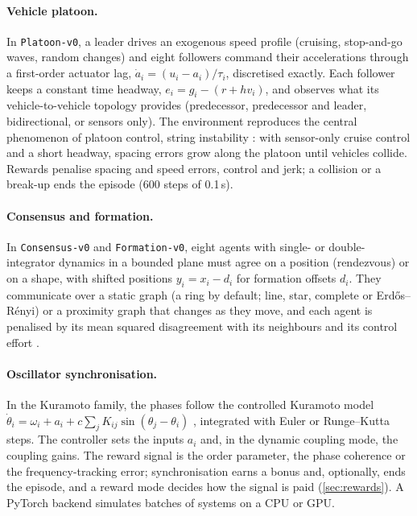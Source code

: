 \documentclass{article}
\newcommand{\envid}[1]{\texttt{#1}}
\begin{document}
\paragraph{Vehicle platoon.} In \envid{Platoon-v0}, a leader drives an
exogenous speed profile (cruising, stop-and-go waves, random changes) and
eight followers command their accelerations through a first-order actuator
lag, $\dot a_i = (u_i - a_i)/\tau_i$, discretised exactly. Each follower keeps
a constant time headway, $e_i = g_i - (r + h v_i)$, and observes what its
vehicle-to-vehicle topology provides (predecessor, predecessor and leader,
bidirectional, or sensors only). The environment reproduces the central
phenomenon of platoon control, string instability
\citep{swaroop1996string,naus2010cacc}: with sensor-only cruise control and a
short headway, spacing errors grow along the platoon until vehicles collide.
Rewards penalise spacing and speed errors, control and jerk; a collision or a
break-up ends the episode (600 steps of 0.1\,s).

\paragraph{Consensus and formation.} In \envid{Consensus-v0} and
\envid{Formation-v0}, eight agents with single- or double-integrator dynamics in a bounded plane
must agree on a position (rendezvous) or on a shape, with shifted positions
$y_i = x_i - d_i$ for formation offsets $d_i$. They communicate over a static
graph (a ring by default; line, star, complete or Erd\H{o}s--R\'enyi) or a
proximity graph that changes as they move, and each agent is penalised by its mean
squared disagreement with its neighbours and its control effort
\citep{olfati2004consensus,olfati2007consensus}.

\paragraph{Oscillator synchronisation.} In the Kuramoto family, the phases
follow the controlled Kuramoto model
$\dot\theta_i = \omega_i + a_i + c\sum_j K_{ij}\sin(\theta_j-\theta_i)$
\citep{kuramoto1984chemical,dorfler2014survey}, integrated with Euler or
Runge--Kutta steps. The controller sets the inputs $a_i$ and, in the dynamic
coupling mode, the coupling gains. The reward signal is the order parameter,
the phase coherence or the frequency-tracking error; synchronisation earns a
bonus and, optionally, ends the episode, and a reward mode decides how the
signal is paid (\cref{sec:rewards}). A PyTorch backend simulates batches of
systems on a CPU or GPU.
\end{document}
